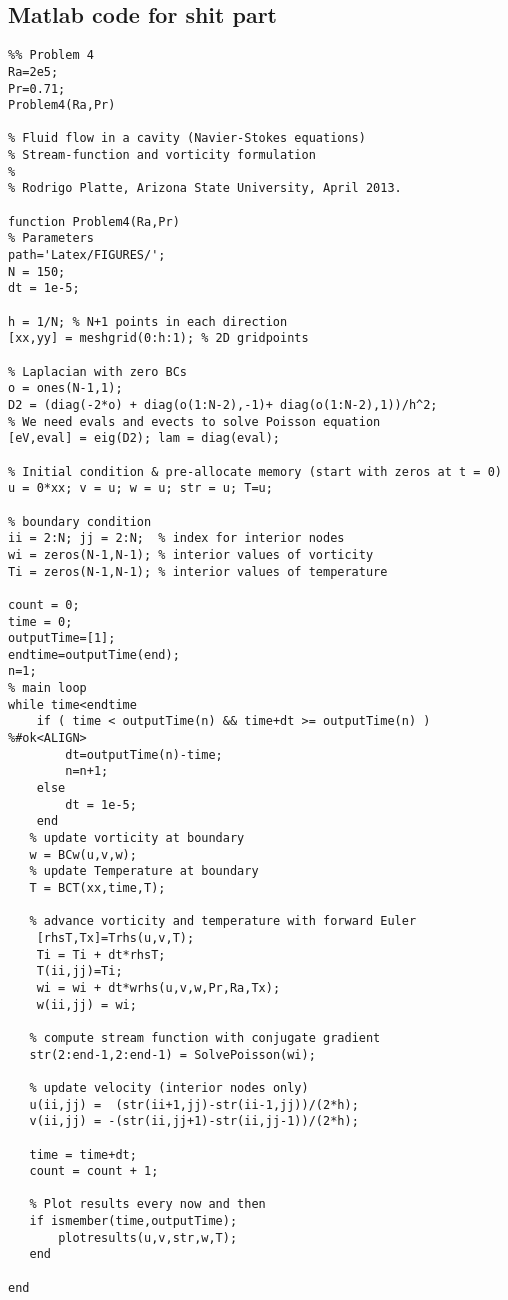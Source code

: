 \subsection*{Matlab code for shit part}
\begin{verbatim}
%% Problem 4
Ra=2e5;
Pr=0.71;
Problem4(Ra,Pr)

% Fluid flow in a cavity (Navier-Stokes equations)
% Stream-function and vorticity formulation
%
% Rodrigo Platte, Arizona State University, April 2013.

function Problem4(Ra,Pr)
% Parameters
path='Latex/FIGURES/';
N = 150;
dt = 1e-5;

h = 1/N; % N+1 points in each direction
[xx,yy] = meshgrid(0:h:1); % 2D gridpoints

% Laplacian with zero BCs
o = ones(N-1,1);
D2 = (diag(-2*o) + diag(o(1:N-2),-1)+ diag(o(1:N-2),1))/h^2;
% We need evals and evects to solve Poisson equation
[eV,eval] = eig(D2); lam = diag(eval); 

% Initial condition & pre-allocate memory (start with zeros at t = 0)
u = 0*xx; v = u; w = u; str = u; T=u;

% boundary condition
ii = 2:N; jj = 2:N;  % index for interior nodes
wi = zeros(N-1,N-1); % interior values of vorticity
Ti = zeros(N-1,N-1); % interior values of temperature

count = 0;
time = 0;
outputTime=[1];
endtime=outputTime(end);
n=1;
% main loop
while time<endtime
	if ( time < outputTime(n) && time+dt >= outputTime(n) ) %#ok<ALIGN>
        dt=outputTime(n)-time;
        n=n+1;
    else
        dt = 1e-5;
    end
   % update vorticity at boundary
   w = BCw(u,v,w);
   % update Temperature at boundary
   T = BCT(xx,time,T);
   
   % advance vorticity and temperature with forward Euler
    [rhsT,Tx]=Trhs(u,v,T);
    Ti = Ti + dt*rhsT;
    T(ii,jj)=Ti;
    wi = wi + dt*wrhs(u,v,w,Pr,Ra,Tx);
    w(ii,jj) = wi;
   
   % compute stream function with conjugate gradient
   str(2:end-1,2:end-1) = SolvePoisson(wi);
   
   % update velocity (interior nodes only)
   u(ii,jj) =  (str(ii+1,jj)-str(ii-1,jj))/(2*h);
   v(ii,jj) = -(str(ii,jj+1)-str(ii,jj-1))/(2*h);
   
   time = time+dt;
   count = count + 1;
   
   % Plot results every now and then
   if ismember(time,outputTime);
       plotresults(u,v,str,w,T);    
   end

end


\end{verbatim}
